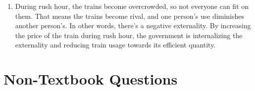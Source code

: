 \documentclass{article}
\begin{document}
\begin{enumerate}
\begin{enumerate}
	\item No, the collective willingness to pay for the fireworks is less than the cost.
	
	\item Again, each person would pay \$120. Ned and Bess would both vote in favor because their willingness to pay is greater than \$120. Nancy would vote against because her willingness to pay is less than \$120. As a result, the referendum would pass, so the vote would not yield the same answer as the cost-benefit analysis.
	
	\item It's difficult to decide whether or not to supply them and how to pay for them fairly. 
	
	\end{enumerate}

\setcounter{enumi}{8}	
\item During rush hour, the trains become overcrowded, so not everyone can fit on them. That means the trains become rival, and one person's use diminishes another person's. In other words, there's a negative externality. By increasing the price of the train during rush hour, the government is internalizing the externality and reducing train usage towards its efficient quantity.

\end{enumerate}

\section*{Non-Textbook Questions}
\end{document}
